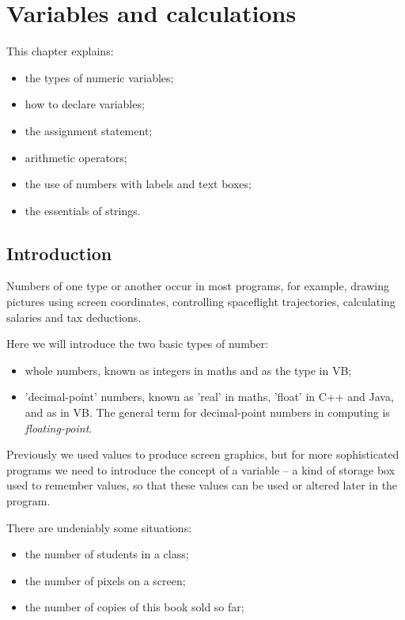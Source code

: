 \chapter{Variables and calculations}
	\label{ch:var}                                                                                                                                                                                                               
	This chapter explains:
	\begin{itemize}
		\item the types of numeric variables;
		\item how to declare variables;
		\item the assignment statement;
		\item arithmetic operators;
		\item the use of numbers with labels and text boxes;
		\item the essentials of strings.
	\end{itemize}

	\section{Introduction}
		Numbers of one type or another occur in most programs, for example, drawing pictures using screen coordinates, controlling spaceflight trajectories, calculating salaries and tax deductions.

		Here we will introduce the two basic types of number:
		\begin{itemize}
			\item whole numbers, known as integers in maths and as the  type in VB;
			\item 'decimal-point' numbers, known as 'real' in maths, 'float' in C++ and Java, and as  in VB. The general term for decimal-point numbers in computing is \emph{floating-point}.
		\end{itemize}
		
		Previously we used values to produce screen graphics, but for more sophisticated programs we need to introduce the concept of a variable – a kind of storage box used to remember values, so that these values can be used or altered later in the program.
		
		There are undeniably some  situations:
		\begin{itemize}
			\item the number of students in a class;
			\item the number of pixels on a screen;
			\item the number of copies of this book sold so far; 
		\end{itemize}
			
